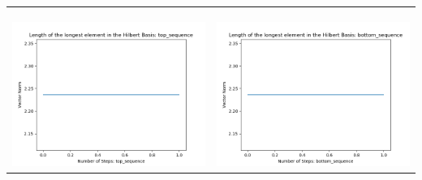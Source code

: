 \documentclass[10pt]{article}
\begin{document}
\begin{tabular}{c|c}
\begin{minipage}{.45\textwidth}
\end{minipage} \\ \\
\hline \\\begin{minipage}{.45\textwidth}
\includegraphics[width=\textwidth]{"DATA/5d/6 generators 1 bound D/top_sequence LENGTH"}
\end{minipage} &
\begin{minipage}{.45\textwidth}
\includegraphics[width=\textwidth]{"DATA/5d/6 generators 1 bound D bottomup/bottom_sequence LENGTH"}
\end{minipage}
\end{tabular}
\end{document}
